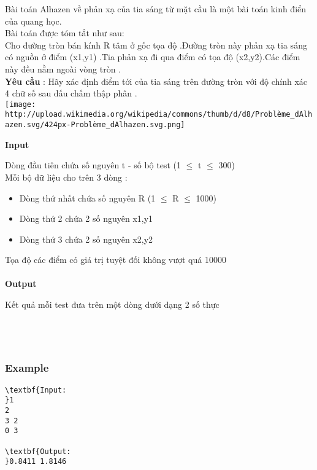 

Bài toán Alhazen về phản xạ của tia sáng từ mặt cầu là một bài toán kinh điển của quang học.
\\Bài toán được tóm tắt như sau:
\\Cho đường tròn bán kính R tâm ở gốc tọa độ .Đường tròn này phản xạ tia sáng có nguồn ở điểm (x1,y1) .Tia phản xạ đi qua điểm có tọa độ (x2,y2).Các điểm này đều nằm ngoài vòng tròn .
\\\textbf{Yêu cầu } : Hãy xác định điểm tới của tia sáng trên đường tròn với độ chính xác 4 chữ số sau dấu chấm thập phân .
\\
\texttt{[image: http://upload.wikimedia.org/wikipedia/commons/thumb/d/d8/Problème\_dAlhazen.svg/424px-Problème\_dAlhazen.svg.png]}\textbf{}

\textbf{Input }

Dòng đầu tiên chứa số nguyên t - số bộ test (1 $\le$ t $\le$ 300)
\\Mỗi bộ dữ liệu cho trên 3 dòng :
\begin{itemize}
	\item Dòng thứ nhất chứa số nguyên R (1 $\le$ R $\le$ 1000)
	\item Dòng thứ 2 chứa 2 số nguyên x1,y1
	\item Dòng thứ 3 chứa 2 số nguyên x2,y2
\end{itemize}

Tọa độ các điểm có giá trị tuyệt đối không vượt quá 10000
\\
\\\textbf{\textbf{Output }}

Kết quả mỗi test đưa trên một dòng dưới dạng 2 số thực
\\
\\
\\ 

\subsubsection{Example}
\begin{verbatim}
\textbf{Input:
}1
2
3 2
0 3

\textbf{Output:
}0.8411 1.8146


\end{verbatim}
